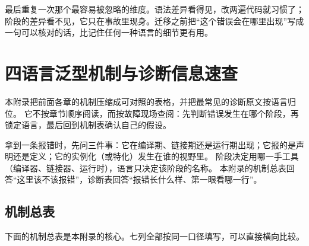 \documentclass[12pt,a4paper,fontset=fandol]{ctexbook}
\begin{document}
最后重复一次那个最容易被忽略的维度。语法差异看得见，改两遍代码就习惯了；阶段的差异看不见，它只在事故里现身。迁移之前把“这个错误会在哪里出现”写成一句可以核对的话，比记住任何一种语言的细节更有用。
\appendix


\chapter{四语言泛型机制与诊断信息速查}

本附录把前面各章的机制压缩成可对照的表格，并把最常见的诊断原文按语言归位。
它不按章节顺序阅读，而按故障现场查阅：先判断错误发生在哪个阶段，再锁定语言，最后回到机制表确认自己的假设。

\begin{note}[title={速查表的用法：先定阶段，再定语言}]
拿到一条报错时，先问三件事：它在编译期、链接期还是运行期出现；它报的是声明还是定义；它的实例化（或特化）发生在谁的视野里。
阶段决定用哪一手工具（编译器、链接器、运行时），语言只决定该阶段的名称。
本附录的机制总表回答“这里该不该报错”，诊断表回答“报错长什么样、第一眼看哪一行”。
\end{note}

\section{机制总表}

下面的机制总表是本附录的核心。七列全部按同一口径填写，可以直接横向比较。
\end{document}
